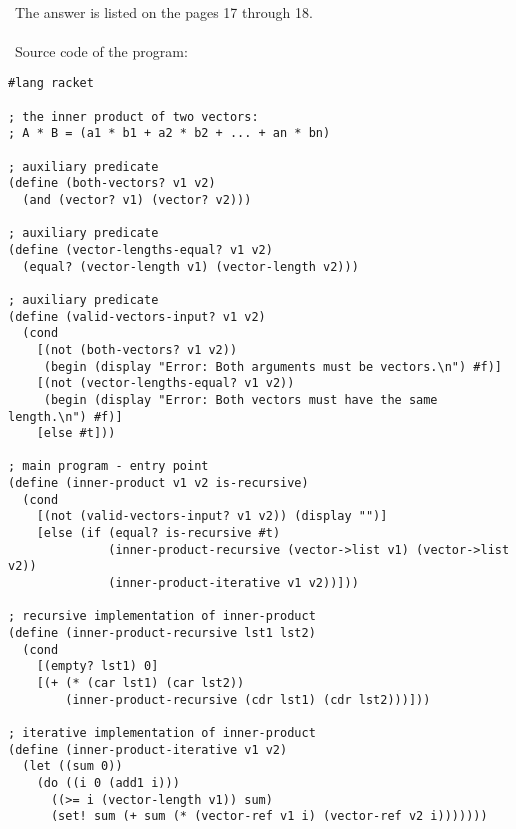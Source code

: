 \documentclass{article}
\begin{document}
\paragraph{}\
	The answer is listed on the pages 17 through 18.
	
\paragraph{}\
Source code of the program:
	
\begin{verbatim} 
#lang racket

; the inner product of two vectors:
; A * B = (a1 * b1 + a2 * b2 + ... + an * bn)

; auxiliary predicate
(define (both-vectors? v1 v2)
  (and (vector? v1) (vector? v2)))

; auxiliary predicate
(define (vector-lengths-equal? v1 v2)
  (equal? (vector-length v1) (vector-length v2)))

; auxiliary predicate
(define (valid-vectors-input? v1 v2)
  (cond
    [(not (both-vectors? v1 v2))
     (begin (display "Error: Both arguments must be vectors.\n") #f)]
    [(not (vector-lengths-equal? v1 v2))
     (begin (display "Error: Both vectors must have the same length.\n") #f)]
    [else #t]))

; main program - entry point
(define (inner-product v1 v2 is-recursive)
  (cond
    [(not (valid-vectors-input? v1 v2)) (display "")]
    [else (if (equal? is-recursive #t)
              (inner-product-recursive (vector->list v1) (vector->list v2))
              (inner-product-iterative v1 v2))]))

; recursive implementation of inner-product
(define (inner-product-recursive lst1 lst2)
  (cond
    [(empty? lst1) 0]
    [(+ (* (car lst1) (car lst2))
        (inner-product-recursive (cdr lst1) (cdr lst2)))]))
  
; iterative implementation of inner-product
(define (inner-product-iterative v1 v2)
  (let ((sum 0))
    (do ((i 0 (add1 i)))
      ((>= i (vector-length v1)) sum)
      (set! sum (+ sum (* (vector-ref v1 i) (vector-ref v2 i)))))))
\end{verbatim}	

\paragraph{}\
\paragraph{}\
\end{document}
